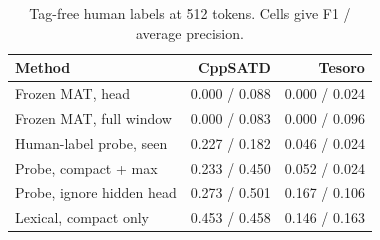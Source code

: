 \begin{table}[t]
\centering
\small\setlength{\tabcolsep}{3pt}
\caption{Tag-free human labels at 512 tokens. Cells give F1 / average precision.}
\label{tab:tagfree}
\begin{tabular}{lrr}
\toprule
Method & CppSATD & Tesoro \\
\midrule
Frozen MAT, head & 0.000 / 0.088 & 0.000 / 0.024 \\
Frozen MAT, full window & 0.000 / 0.083 & 0.000 / 0.096 \\
Human-label probe, seen & 0.227 / 0.182 & 0.046 / 0.024 \\
Probe, compact + max & 0.233 / 0.450 & 0.052 / 0.024 \\
Probe, ignore hidden head & 0.273 / 0.501 & 0.167 / 0.106 \\
Lexical, compact only & 0.453 / 0.458 & 0.146 / 0.163 \\
\bottomrule
\end{tabular}
\end{table}
